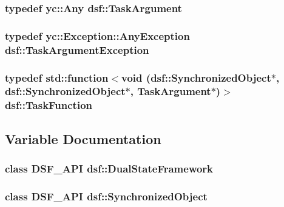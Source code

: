 \subsubsection[{Task\+Argument}]{\setlength{\rightskip}{0pt plus 5cm}typedef yc\+::\+Any {\bf dsf\+::\+Task\+Argument}}\label{namespacedsf_abe4bf68433935a81c31a5ada9b17663a}
\hypertarget{namespacedsf_af54027177bbfc0037be408a612d48b83}{}
\subsubsection[{Task\+Argument\+Exception}]{\setlength{\rightskip}{0pt plus 5cm}typedef yc\+::\+Exception\+::\+Any\+Exception {\bf dsf\+::\+Task\+Argument\+Exception}}\label{namespacedsf_af54027177bbfc0037be408a612d48b83}
\hypertarget{namespacedsf_aa16e735f29587f4485b56fc46746f7a9}{}
\subsubsection[{Task\+Function}]{\setlength{\rightskip}{0pt plus 5cm}typedef std\+::function$<$void ({\bf dsf\+::\+Synchronized\+Object}$\ast$, {\bf dsf\+::\+Synchronized\+Object}$\ast$, {\bf Task\+Argument}$\ast$)$>$ {\bf dsf\+::\+Task\+Function}}\label{namespacedsf_aa16e735f29587f4485b56fc46746f7a9}


\subsection{Variable Documentation}
\hypertarget{namespacedsf_a68ac3b6a0526bfa7f6a412918afb1841}{}
\subsubsection[{Dual\+State\+Framework}]{\setlength{\rightskip}{0pt plus 5cm}class D\+S\+F\+\_\+\+A\+P\+I {\bf dsf\+::\+Dual\+State\+Framework}}\label{namespacedsf_a68ac3b6a0526bfa7f6a412918afb1841}
\hypertarget{namespacedsf_acbf1798fc56cfb1707162a17e13f5fda}{}
\subsubsection[{Synchronized\+Object}]{\setlength{\rightskip}{0pt plus 5cm}class D\+S\+F\+\_\+\+A\+P\+I {\bf dsf\+::\+Synchronized\+Object}}\label{namespacedsf_acbf1798fc56cfb1707162a17e13f5fda}
\hypertarget{namespacedsf_a7df24c7d3d82e2e686aa3a524dc1dee9}{}
